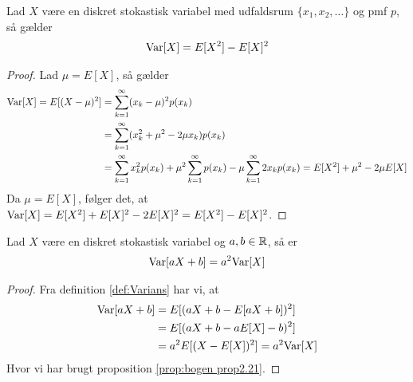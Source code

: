\begin{cor} \label{cor:VariansIForholdTilForventedVærdi} %
    Lad $X$ være en diskret stokastisk variabel med udfaldsrum $\{x_1, x_2, \ldots\}$ og pmf $p$, så gælder
    \begin{align*}
      \textnormal{Var}[X]=E[X^2]-E[X]^2
    \end{align*}
\end{cor}
\begin{proof}
    Lad $\mu = E[X]$, så gælder
    \begin{align*}
        \textnormal{Var}[X] = E[(X - \mu)^2] &= \sum^\infty_{k = 1} (x_k - \mu)^2 p(x_k)\\
        &= \sum^\infty_{k = 1} (x_k^2 + \mu^2 - 2\mu x_k)p(x_k) \\
        &= \sum^\infty_{k = 1} x_k^2 p(x_k) + \mu^2 \sum^\infty_{k = 1} p(x_k) - \mu \sum^\infty_{k = 1} 2x_k p(x_k) = E[X^2] + \mu^2 - 2\mu E[X]
    \end{align*}
    Da $\mu = E[X]$, følger det, at $\textnormal{Var}[X] = E[X^2] + E[X]^2 - 2E[X]^2 = E[X^2] - E[X]^2$.
\end{proof}




\begin{prop}\label{prop:prop2.15} %
Lad $X$ være en diskret stokastisk variabel og $a, b\in \mathbb{R}$, så er
\begin{align*}
    \textnormal{Var}[aX+b]=a^2\textnormal{Var}[X]
\end{align*}
\end{prop}
\begin{proof}
Fra definition \ref{def:Varians} har vi, at 
    \begin{align*}
        \textnormal{Var}[aX+b]&=E[(aX+b-E[aX+b])^2]\\
        &=E[(aX+b-aE[X]-b)^2]\\
        &=a^2E[(X-E[X])^2]=a^2\textnormal{Var}[X]
    \end{align*}
Hvor vi har brugt proposition \ref{prop:bogen prop2.21}.
\end{proof}
